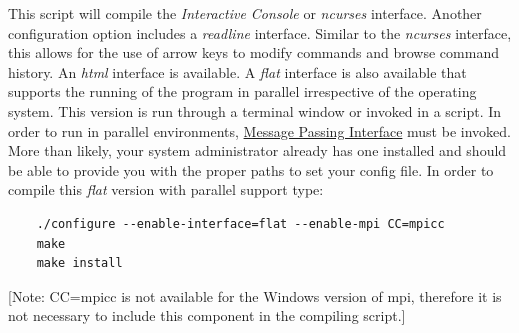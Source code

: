 This script will compile the \emph{Interactive Console} or \emph{ncurses} interface.  
Another configuration option includes a \emph{readline} interface.  Similar to the \emph{ncurses} interface, 
this allows for the use of arrow keys to modify commands and browse command history.  An \emph{html} interface is  
available. A \emph{flat} interface is also available that supports the running of the program in parallel irrespective of 
the operating system. This version is run through a terminal window or invoked in a script. In order to run \poy in parallel environments, 
\href{http://www-unix.mcs.anl.gov/mpi/}{Message Passing Interface} must be invoked. More than likely, your system 
administrator already has one installed and should be able to provide you with the proper paths to set your config file. 
In order to compile this \emph{flat} version with parallel support type: 
	\begin{verbatim}
	./configure --enable-interface=flat --enable-mpi CC=mpicc
	make
	make install
	\end{verbatim}
[Note: CC=mpicc is not available for the Windows version of mpi, therefore it is not necessary to include this component in the compiling script.] 



